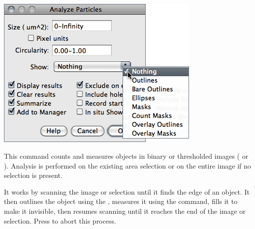 \subsection{\protect{}\label{sub:Analyze-Particles...}}

\begin{minipage}[c][1\totalheight][t]{0.515\columnwidth}%
\includegraphics[scale=0.55]{images/AnalyzeParticles}%
\end{minipage}%
\begin{minipage}[c][1\totalheight][t]{0.485\columnwidth}%
This command counts and measures objects in binary or thresholded
images (
or ). Analysis is
performed on the existing area selection or on the entire image if
no selection is present.

\medskip{}
It works by scanning the image or selection until it finds the edge
of an object. It then outlines the object using the ,
measures it using the 
command, fills it to make it invisible, then resumes scanning until
it reaches the end of the image or selection. Press 
to abort this process.%
\end{minipage}

